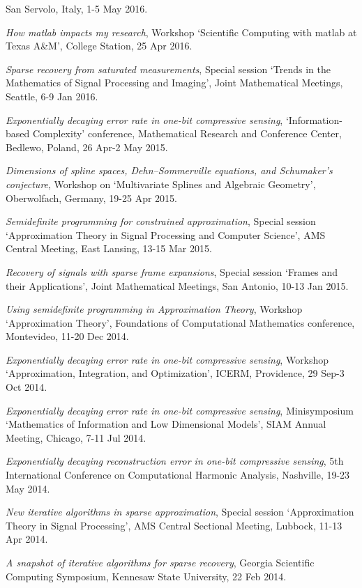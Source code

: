 \documentclass[11pt]{article}
\begin{document}
San Servolo, Italy, 1-5 May 2016.
\item {\sl How {\sc matlab} impacts my research},
Workshop `Scientific Computing with {\sc matlab} at Texas A\&M',
College Station, 25 Apr 2016. 
\item {\sl Sparse recovery from saturated measurements},
Special session `Trends in the Mathematics of Signal Processing and Imaging',
Joint Mathematical Meetings, Seattle, 6-9 Jan 2016.
\item {\sl Exponentially decaying error rate in one-bit compressive sensing}, `Information-based Complexity' conference, 
Mathematical Research and Conference Center, Bedlewo, Poland,
26 Apr-2 May 2015.
\item {\sl Dimensions of spline spaces, Dehn--Sommerville equations, and Schumaker’s conjecture},
Workshop on `Multivariate Splines and Algebraic Geometry', Oberwolfach, Germany, 19-25 Apr 2015.
\item {\sl Semidefinite programming for constrained approximation}, Special session `Approximation Theory in Signal Processing and Computer Science', AMS \mbox{Central} Meeting, East Lansing, 13-15 Mar 2015.
\item {\sl Recovery of signals with sparse frame expansions}, Special session `Frames and their Applications', Joint Mathematical Meetings, San Antonio, 10-13 Jan 2015. 
\item {\sl Using semidefinite programming in Approximation Theory}, Workshop `Approximation Theory',
Foundations of Computational Mathematics conference, Montevideo, 11-20 Dec 2014.
\item {\sl Exponentially decaying error rate in one-bit compressive sensing}, Workshop `Approximation, Integration, and Optimization',
ICERM, Providence, 29 Sep-3 Oct 2014. 
\item {\sl Exponentially decaying error rate in one-bit compressive sensing}, Minisymposium `Mathematics of Information and Low Dimensional Models',
SIAM Annual Meeting, Chicago, 7-11 Jul 2014.
\item {\sl Exponentially decaying reconstruction error in one-bit compressive sensing},  
5th International Conference on Computational Harmonic Analysis, Nashville, 19-23 May 2014.
\item {\sl New iterative algorithms in sparse approximation}, Special session `Approximation Theory in Signal Processing', AMS Central Sectional Meeting, Lubbock, 11-13 Apr 2014.
\item {\sl A snapshot of iterative algorithms for sparse recovery}, Georgia Scientific Computing Symposium, Kennesaw State University, 22 Feb 2014.
\end{document}
